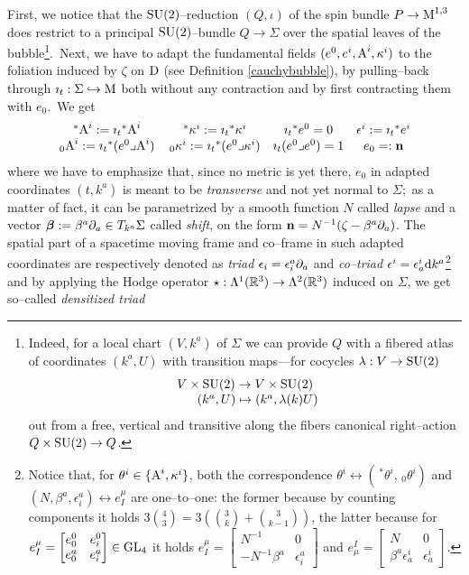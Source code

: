 First, we notice that the $\text{\normalfont SU}(2)$--reduction $(Q,\iota)$ of the spin bundle $P\to\text{\normalfont M}^{1,3}$ does restrict to a principal $\text{\normalfont SU}(2)$--bundle $Q\to\Sigma$ over the spatial leaves of the bubble\footnote{Indeed, for a local chart $(V,k^a)$ of $\Sigma$ we can provide $Q$ with a fibered atlas of coordinates $(k^a,U)$ with transition maps---for cocycles $\lambda:V\to\text{\normalfont SU}(2)$
$$\begin{matrix}
    V\times\text{\normalfont SU}(2)\to V\times\text{\normalfont SU}(2)\\
    \qquad(k^a,U)\mapsto(k^a,\lambda(k)U)
\end{matrix}$$
out from a free, vertical and transitive along the fibers canonical right--action $Q\times{\text{\normalfont SU}(2)}\to Q$.}.\, Next, we have to adapt the fundamental fields $(e^0,e^i,\text{\normalfont A}^i,\kappa^i)$ to the foliation induced by $\zeta$ on $\text{\normalfont D}$ (see Definition \ref{cauchybubble}), by pulling--back through $\imath_t:\Sigma\hookrightarrow\text{\normalfont M}$ both without any contraction and by first contracting them with $e_0$.\, We get 
$$\begin{matrix}
    \,^*\text{\normalfont A}^i:={\imath_t}^*\text{\normalfont A}^i&\,^*\kappa^i:={\imath_t}^*\kappa^i&{\imath_t}^*e^0=0&\epsilon^i:={\imath_t}^*e^i\\
    \,_0\text{\normalfont A}^i:={\imath_t}^*(e^0\lrcorner \text{\normalfont A}^i)&\,_0\kappa^i:={\imath_t}^*(e^0\lrcorner \kappa^i)&{\imath_t}(e^0\lrcorner e^0)=1&e_0=:\mathbf{n}
\end{matrix}$$
where we have to emphasize that, since no metric is yet there, $e_0$ in adapted coordinates $(t,k^a)$ is meant to be \emph{transverse} and not yet normal to $\Sigma$;\, as a matter of fact, it can be parametrized by a smooth function $N$ called \emph{lapse} and a vector $\boldsymbol{\beta}:=\beta^a\partial_a\in T_{k^a}\Sigma$ called \emph{shift}, on the form  $\mathbf{n}=N^{-1}(\zeta-\beta^a\partial_a)$. The spatial part of a spacetime moving frame and co--frame in such adapted coordinates are respectively denoted as \emph{triad} $\epsilon_i=\epsilon^a_i\partial_a$ and \emph{co--triad} $\epsilon^i=\epsilon^i_a\text{\normalfont d} k^a$\footnote{Notice that, for $\theta^i\in\{\text{\normalfont A}^i,\kappa^i\}$, both the correspondence $\theta^i\leftrightarrow(\,^*\theta^i,\,_0\theta^i)$ and $(N,\beta^a,\epsilon^a_i)\leftrightarrow e^\mu_I$ are one--to--one: the former because by counting components it holds $3\binom{4}{3}=3\left(\binom{3}{k}+\binom{3}{k-1}\right)$, the latter because for $e^\mu_I=\begin{bmatrix}
    e^0_0&e^0_i\\
    e^a_0&e^a_i
\end{bmatrix}\in\text{\normalfont GL}_4$ it holds $e^\mu_I=\begin{bmatrix}
    N^{-1}&0\\
    -N^{-1}\beta^a&\epsilon^a_i
\end{bmatrix}$ and $e^I_\mu=\begin{bmatrix}
    N&0\\
    \beta^a\epsilon_a^i&\epsilon^i_a
\end{bmatrix}$.} and by applying the Hodge operator $\star:\Lambda^1(\mathbb{R}^3)\to\Lambda^2(\mathbb{R}^3)$ induced on $\Sigma$, we get so--called \emph{densitized triad}

